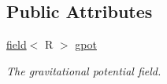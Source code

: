 \subsection*{Public Attributes}
\begin{DoxyCompactItemize}
\item 
\hypertarget{classgpot__computer_af421e1381ed708d783c9012c4efdcb54}{
\hyperlink{classfield}{field}$<$ R $>$ \hyperlink{classgpot__computer_af421e1381ed708d783c9012c4efdcb54}{gpot}}
\label{classgpot__computer_af421e1381ed708d783c9012c4efdcb54}

\begin{DoxyCompactList}\small\item\em The gravitational potential field. \item\end{DoxyCompactList}\end{DoxyCompactItemize}
